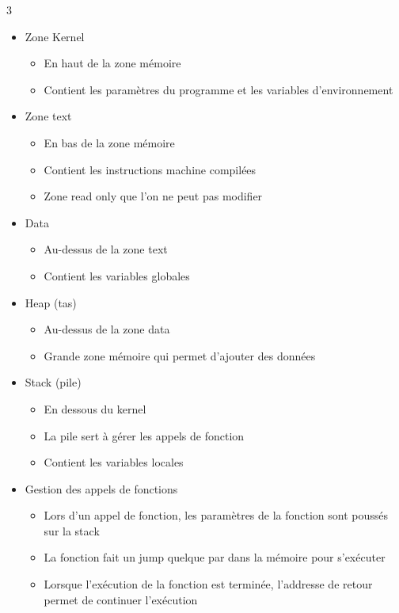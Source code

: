 \documentclass[9pt, a4paper, twoside]{article}
\begin{document}
\begin{multicols}{3}
\begin{itemize}[label=$\bullet$]
    \item \scriptsize Zone Kernel
    \begin{itemize}[label=$\circ$]
        \item \scriptsize En haut de la zone mémoire
        \item \scriptsize Contient les paramètres du programme et les variables d'environnement
    \end{itemize}
    \item \scriptsize Zone text
    \begin{itemize}[label=$\circ$]
        \item \scriptsize En bas de la zone mémoire
        \item \scriptsize Contient les instructions machine compilées
        \item \scriptsize Zone read only que l'on ne peut pas modifier
    \end{itemize}
    \item \scriptsize Data
    \begin{itemize}[label=$\circ$]
        \item \scriptsize Au-dessus de la zone text
        \item \scriptsize Contient les variables globales
    \end{itemize}
    \item \scriptsize Heap (tas)
    \begin{itemize}[label=$\circ$]
        \item \scriptsize Au-dessus de la zone data
        \item \scriptsize Grande zone mémoire qui permet d'ajouter des données
    \end{itemize}
    \item \scriptsize Stack (pile)
    \begin{itemize}[label=$\circ$]
        \item \scriptsize En dessous du kernel
        \item \scriptsize La pile sert à gérer les appels de fonction 
        \item \scriptsize Contient les variables locales
    \end{itemize}
    \item \scriptsize Gestion des appels de fonctions
    \begin{itemize}[label=$\circ$]
        \item \scriptsize Lors d'un appel de fonction, les paramètres de la fonction sont poussés sur la stack
        \item \scriptsize La fonction fait un jump quelque par dans la mémoire pour s'exécuter
        \item \scriptsize Lorsque l'exécution de la fonction est terminée, l'addresse de retour permet de continuer l'exécution
    \end{itemize}
\end{itemize}


\end{multicols}
\end{document}

